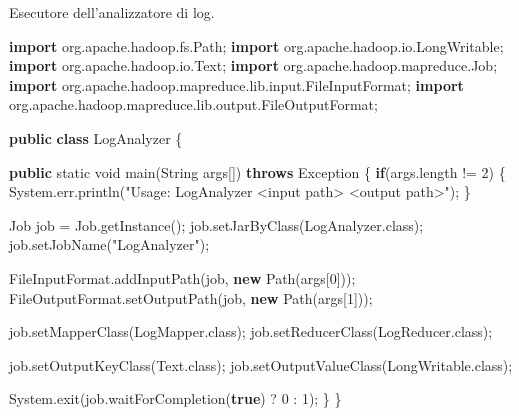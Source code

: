 \documentclass[italian,a4paper, twoside, 12pt]{report}
\newenvironment{Shaded}{}{}
\newcommand{\KeywordTok}[1]{\textcolor[rgb]{0.00,0.44,0.13}{\textbf{#1}}}
\newcommand{\DataTypeTok}[1]{\textcolor[rgb]{0.56,0.13,0.00}{#1}}
\newcommand{\DecValTok}[1]{\textcolor[rgb]{0.25,0.63,0.44}{#1}}
\newcommand{\StringTok}[1]{\textcolor[rgb]{0.25,0.44,0.63}{#1}}
\newcommand{\ImportTok}[1]{#1}
\newcommand{\FunctionTok}[1]{\textcolor[rgb]{0.02,0.16,0.49}{#1}}
\newcommand{\BuiltInTok}[1]{#1}
\newcommand{\NormalTok}[1]{#1}
\begin{document}
\begin{codelisting}

\caption{Esecutore dell'analizzatore di log.}

\hypertarget{lst:log-executor}{\label{lst:log-executor}}
\begin{Shaded}
\begin{Highlighting}[numbers=left,,]
\KeywordTok{import}\ImportTok{ org.apache.hadoop.fs.Path;}
\KeywordTok{import}\ImportTok{ org.apache.hadoop.io.LongWritable;}
\KeywordTok{import}\ImportTok{ org.apache.hadoop.io.Text;}
\KeywordTok{import}\ImportTok{ org.apache.hadoop.mapreduce.Job;}
\KeywordTok{import}\ImportTok{ org.apache.hadoop.mapreduce.lib.input.FileInputFormat;}
\KeywordTok{import}\ImportTok{ org.apache.hadoop.mapreduce.lib.output.FileOutputFormat;}

\KeywordTok{public} \KeywordTok{class}\NormalTok{ LogAnalyzer \{}

    \KeywordTok{public} \DataTypeTok{static} \DataTypeTok{void} \FunctionTok{main}\NormalTok{(}\BuiltInTok{String}\NormalTok{ args[]) }\KeywordTok{throws} \BuiltInTok{Exception}\NormalTok{ \{}
        \KeywordTok{if}\NormalTok{(args.}\FunctionTok{length}\NormalTok{ != }\DecValTok{2}\NormalTok{) \{}
            \BuiltInTok{System}\NormalTok{.}\FunctionTok{err}\NormalTok{.}\FunctionTok{println}\NormalTok{(}\StringTok{"Usage: LogAnalyzer <input path> <output path>"}\NormalTok{);}
\NormalTok{        \}}

\NormalTok{        Job job = Job.}\FunctionTok{getInstance}\NormalTok{();}
\NormalTok{        job.}\FunctionTok{setJarByClass}\NormalTok{(LogAnalyzer.}\FunctionTok{class}\NormalTok{);}
\NormalTok{        job.}\FunctionTok{setJobName}\NormalTok{(}\StringTok{"LogAnalyzer"}\NormalTok{);}

\NormalTok{        FileInputFormat.}\FunctionTok{addInputPath}\NormalTok{(job, }\KeywordTok{new} \FunctionTok{Path}\NormalTok{(args[}\DecValTok{0}\NormalTok{]));}
\NormalTok{        FileOutputFormat.}\FunctionTok{setOutputPath}\NormalTok{(job, }\KeywordTok{new} \FunctionTok{Path}\NormalTok{(args[}\DecValTok{1}\NormalTok{]));}

\NormalTok{        job.}\FunctionTok{setMapperClass}\NormalTok{(LogMapper.}\FunctionTok{class}\NormalTok{);}
\NormalTok{        job.}\FunctionTok{setReducerClass}\NormalTok{(LogReducer.}\FunctionTok{class}\NormalTok{);}

\NormalTok{        job.}\FunctionTok{setOutputKeyClass}\NormalTok{(}\BuiltInTok{Text}\NormalTok{.}\FunctionTok{class}\NormalTok{);}
\NormalTok{        job.}\FunctionTok{setOutputValueClass}\NormalTok{(LongWritable.}\FunctionTok{class}\NormalTok{);}

        \BuiltInTok{System}\NormalTok{.}\FunctionTok{exit}\NormalTok{(job.}\FunctionTok{waitForCompletion}\NormalTok{(}\KeywordTok{true}\NormalTok{) ? }\DecValTok{0}\NormalTok{ : }\DecValTok{1}\NormalTok{);}
\NormalTok{    \}}
\NormalTok{\}}
\end{Highlighting}
\end{Shaded}

\end{codelisting}
\end{document}
